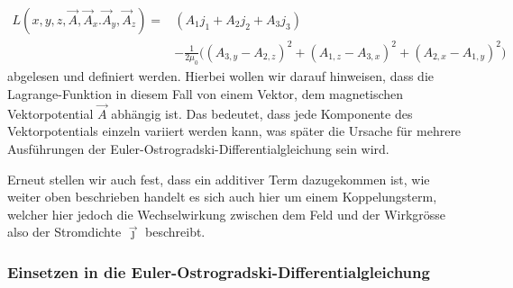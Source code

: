	\begin{align}
	\label{maxwell:magnetostatikLagrange}
	L\left(x,y,z, \vec{A}, \vec{A}_x. \vec{A}_y, \vec{A}_z\right)
	=&\left( A_1j_1 + A_2j_2 + A_3j_3\right) \\ \nonumber
	 &- \frac{1}{2\mu_0}\bigl( 
	( A_{3,y} - A_{2,z})^2 
	+ (A_{1,z} -A_{3,x})^2
	+ (A_{2,x} -A_{1,y})^2   
	\bigr)
	\end{align}
abgelesen und definiert werden. 
Hierbei wollen wir darauf hinweisen, dass die Lagrange-Funktion in diesem Fall von einem Vektor, dem magnetischen Vektorpotential $\vec{A}$ abhängig ist. 
Das bedeutet, dass jede Komponente des Vektorpotentials einzeln variiert werden kann, was später die Ursache für mehrere Ausführungen der Euler-Ostrogradski-Differentialgleichung sein wird.

Erneut stellen wir auch fest, dass ein additiver Term dazugekommen ist, wie weiter oben beschrieben handelt es sich auch hier um einem Koppelungsterm, welcher hier jedoch die Wechselwirkung zwischen dem Feld und der Wirkgrösse also der Stromdichte $\vec{\jmath}$ beschreibt.

\subsubsection{Einsetzen in die Euler-Ostrogradski-Differentialgleichung}

